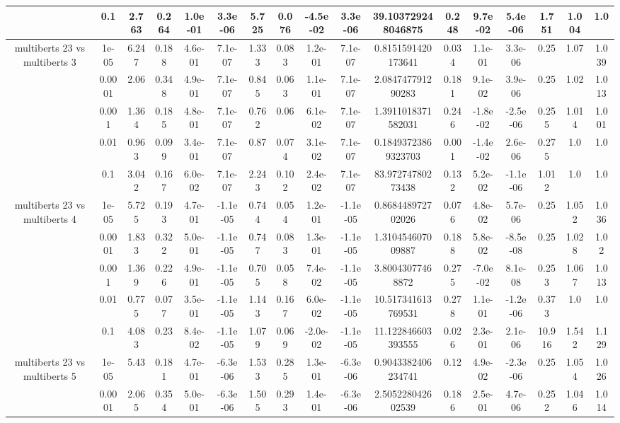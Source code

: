 \begin{tabular}{|c|c|c|c|c|c|c|c|c|c|c|c|c|c|c|c|c|}
 & 0.1 & 2.763 & 0.264 & 1.0e-01 & 3.3e-06 & 5.725 & 0.076 & -4.5e-02 & 3.3e-06 & 39.103729248046875 & 0.248 & 9.7e-02 & 5.4e-06 & 1.751 & 1.004 & 1.0 \\
\hline
\multirow{5}{*}{multiberts 23 vs multiberts 3} & 1e-05 & 6.247 & 0.188 & 4.6e-01 & 7.1e-07 & 1.333 & 0.083 & 1.2e-01 & 7.1e-07 & 0.8151591420173641 & 0.034 & 1.1e-01 & 3.3e-06 & 0.25 & 1.07 & 1.039 \\
 & 0.0001 & 2.06 & 0.348 & 4.9e-01 & 7.1e-07 & 0.845 & 0.063 & 1.1e-01 & 7.1e-07 & 2.084747791290283 & 0.181 & 9.1e-02 & 3.9e-06 & 0.25 & 1.02 & 1.013 \\
 & 0.001 & 1.364 & 0.185 & 4.8e-01 & 7.1e-07 & 0.762 & 0.06 & 6.1e-02 & 7.1e-07 & 1.3911018371582031 & 0.246 & -1.8e-02 & -2.5e-06 & 0.255 & 1.014 & 1.001 \\
 & 0.01 & 0.963 & 0.099 & 3.4e-01 & 7.1e-07 & 0.87 & 0.074 & 3.1e-02 & 7.1e-07 & 0.18493723869323703 & 0.001 & -1.4e-02 & 2.6e-06 & 0.275 & 1.0 & 1.0 \\
 & 0.1 & 3.042 & 0.167 & 6.0e-02 & 7.1e-07 & 2.243 & 0.102 & 2.4e-02 & 7.1e-07 & 83.97274780273438 & 0.132 & 5.2e-02 & -1.1e-06 & 1.012 & 1.0 & 1.0 \\
\hline
\multirow{5}{*}{multiberts 23 vs multiberts 4} & 1e-05 & 5.725 & 0.193 & 4.7e-01 & -1.1e-05 & 0.744 & 0.054 & 1.2e-01 & -1.1e-05 & 0.868448972702026 & 0.076 & 4.8e-02 & 5.7e-06 & 0.25 & 1.052 & 1.036 \\
 & 0.0001 & 1.833 & 0.322 & 5.0e-01 & -1.1e-05 & 0.747 & 0.083 & 1.3e-01 & -1.1e-05 & 1.310454607009887 & 0.188 & 5.8e-02 & -8.5e-08 & 0.25 & 1.028 & 1.02 \\
 & 0.001 & 1.369 & 0.226 & 4.9e-01 & -1.1e-05 & 0.705 & 0.058 & 7.4e-02 & -1.1e-05 & 3.80043077468872 & 0.275 & -7.0e-02 & 8.1e-08 & 0.253 & 1.067 & 1.013 \\
 & 0.01 & 0.775 & 0.077 & 3.5e-01 & -1.1e-05 & 1.143 & 0.167 & 6.0e-02 & -1.1e-05 & 10.517341613769531 & 0.278 & 1.1e-01 & -1.2e-06 & 0.373 & 1.0 & 1.0 \\
 & 0.1 & 4.083 & 0.23 & 8.4e-02 & -1.1e-05 & 1.079 & 0.069 & -2.0e-02 & -1.1e-05 & 11.122846603393555 & 0.026 & 2.3e-01 & 2.1e-06 & 10.916 & 1.542 & 1.129 \\
\hline
\multirow{5}{*}{multiberts 23 vs multiberts 5} & 1e-05 & 5.43 & 0.181 & 4.7e-01 & -6.3e-06 & 1.533 & 0.285 & 1.3e-01 & -6.3e-06 & 0.9043382406234741 & 0.12 & 4.9e-02 & -2.3e-06 & 0.25 & 1.054 & 1.026 \\
 & 0.0001 & 2.065 & 0.354 & 5.0e-01 & -6.3e-06 & 1.505 & 0.293 & 1.4e-01 & -6.3e-06 & 2.505228042602539 & 0.186 & 2.5e-01 & 4.7e-06 & 0.252 & 1.046 & 1.014 \\

\end{tabular}
